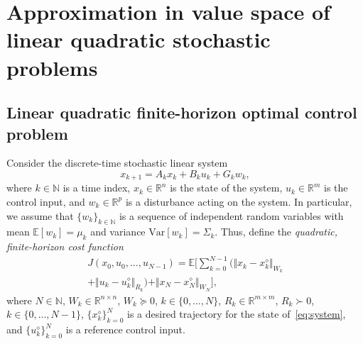 \documentclass[10pt]{IEEEtran}      %
\newcommand{\R}{\mathbb{R}}
\newcommand{\N}{\mathbb{N}}
\newcommand{\bE}{\mathbb{E}}
\theoremstyle{theorem}
\theoremstyle{remark}
\begin{document}
\section{Approximation in value space of linear quadratic stochastic problems}\label{sec:lqfhocp}

\subsection{Linear quadratic finite-horizon optimal control problem\label{ssec:lqs}}
\label{sec:track}
Consider the discrete-time stochastic linear system
\begin{equation}
x_{k+1} = A_k x_k + B_k u_k+G_kw_k,
\label{eq:system}%
\end{equation}
where $k\in\N$ is a time index, $x_k\in\R^n$ is the state of the system, $u_k\in\R^m$ is the control input,
and $w_k\in\R^p$ is a disturbance acting on the system. In particular, we assume that $\{w_k\}_{k\in\N}$ is a sequence of 
independent random variables with mean $\bE[w_k]=\mu_k$ and variance $\mathrm{Var}[w_k]=\Sigma_k$.
Thus, define the \emph{quadratic, finite-horizon cost function} 
\begin{multline}\label{eq:cost}
J(x_0,u_0,\dots,u_{N-1})
=\bE\biggr[\sum_{k=0}^{N-1}\biggr(\Vert x_k-x_k^\diamond\Vert_{W_k} \\
+\Vert u_k-u_k^\diamond\Vert_{R_k}\biggr)+\Vert x_N-x_N^\diamond\Vert_{W_N}\biggr],
\end{multline}
where $N\in \N$, $W_k\in\R^{n\times n}$, $W_k\succeq 0$, $k\in\{0,\dots,N\}$, $R_k\in\R^{m\times m}$, $R_k\succ 0$, $k\in\{0,\dots,N-1\}$,
 $\{x_k^\diamond\}_{k=0}^{N}$ is a desired trajectory for the state of~\eqref{eq:system},
 and $\{u_k^\diamond\}_{k=0}^{N}$ is a reference control input.
\end{document}
